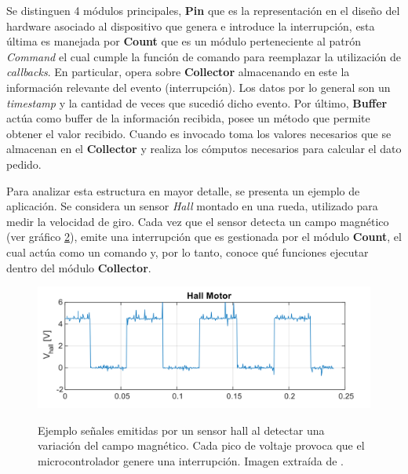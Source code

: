 \begin{figure}[h!]
\label{fig:ConnectBufferToMCU}
\end{figure}


Se distinguen 4 módulos principales, \textbf{Pin} que es la representación en el diseño del hardware asociado al dispositivo que genera e introduce la interrupción, esta última es manejada por \textbf{Count} que es un módulo perteneciente al patrón \textit{Command} el cual cumple la función de comando para reemplazar la utilización de \textit{callbacks}. En particular, opera sobre \textbf{Collector} almacenando en este la información relevante del evento (interrupción). Los datos por lo general son un \textit{timestamp} y la cantidad de veces que sucedió dicho evento. Por último, \textbf{Buffer} actúa como buffer de la información recibida, posee un método que permite obtener el valor recibido. Cuando es invocado toma los valores necesarios que se almacenan en el \textbf{Collector} y realiza los cómputos necesarios para calcular el dato pedido.

Para analizar esta estructura en mayor detalle, se presenta un ejemplo de aplicación. Se considera un sensor \textit{Hall} montado en una rueda, utilizado para medir la velocidad de giro. Cada vez que el sensor detecta un campo magnético (ver gráfico \ref{hall}), emite una interrupción que es gestionada por el módulo \textbf{Count}, el cual actúa como un comando y, por lo tanto, conoce qué funciones ejecutar dentro del módulo \textbf{Collector}.

\begin{figure}[H]
    
    \caption{Ejemplo señales emitidas por un sensor hall al detectar una variación del campo magnético. Cada pico de voltaje provoca que el microcontrolador genere una interrupción. Imagen extraída de \cite{disenioViejo2}.}
    \centering
    \includegraphics[width=0.8\linewidth]{sensorHall.png}
    \label{hall}
\end{figure}


